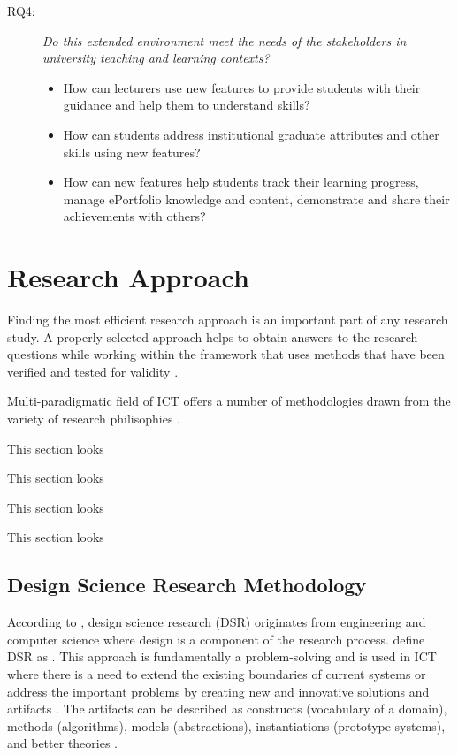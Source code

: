 \begin{description}
	\item[RQ4:] \textit{Do this extended environment meet the needs of the
	stakeholders in university teaching and learning contexts?}
	\begin{itemize}
		\item How can lecturers use new features to provide students with their
guidance and help them to understand \LLLs skills?
		\item How can students address institutional graduate attributes and other
		skills using new features?
		\item How can new features help students track their learning progress, manage
ePortfolio knowledge and content, demonstrate and share their achievements
with others?
	\end{itemize}
\end{description}

\section{Research Approach}
\label{sec:method}

Finding the most efficient research approach is an important part of any
research study. A properly selected approach helps to obtain answers to the
research questions while working within the framework that uses methods that
have been verified and tested for validity \citep{Kumar2005}.

Multi-paradigmatic field of ICT offers a number of methodologies drawn from the
variety of research philisophies \citep{Vaishnavi2007}.

This section looks 

This section looks 
 
This section looks

This section looks  

\subsection{Design Science Research Methodology}

According to \citet{Peffers2008}, design science research (DSR) originates from
engineering and computer science where design is a component of the research
process. \citet{Iivari2009} define DSR as . This approach is fundamentally a problem-solving and is used in
ICT where there is a need to extend the existing boundaries of current systems
or address the important problems by creating new and innovative solutions and
artifacts \citep{Hevner2004}. The artifacts can be described as constructs
(vocabulary of a domain), methods (algorithms), models (abstractions),
instantiations (prototype systems), and better theories
\citep{Hevner2010,Vaishnavi2007}.

